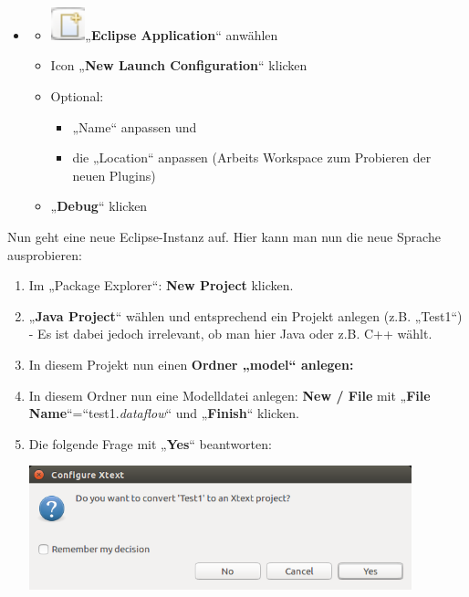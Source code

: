 \documentclass[]{article}
\providecommand{\tightlist}{%
  \setlength{\itemsep}{0pt}\setlength{\parskip}{0pt}}
\begin{document}
\begin{itemize}
\item
  \begin{itemize}
  \item
    \includegraphics[width=0.39290in,height=0.37360in]{./Pictures/10000201000000150000001454902A3E6367315A.png}„\textbf{Eclipse
    Application}`` anwählen
  \item
    Icon „\textbf{New Launch Configuration}`` klicken 
  \item
    Optional:

    \begin{itemize}
    \tightlist
    \item
      „Name`` anpassen und
    \item
      die „Location`` anpassen (Arbeits Workspace zum Probieren der
      neuen Plugins)
    \end{itemize}
  \item
    „\textbf{Debug}`` klicken
  \end{itemize}
\end{itemize}

Nun geht eine neue Eclipse-Instanz auf. Hier kann man nun die neue
Sprache ausprobieren:

\begin{enumerate}
\def\labelenumi{\arabic{enumi}.}
\item
  Im „Package Explorer``: \textbf{New Project} klicken.
\item
  „\textbf{Java Project}`` wählen und entsprechend ein Projekt anlegen
  (z.B. „Test1``) - Es ist dabei jedoch irrelevant, ob man hier Java
  oder z.B. C++ wählt.
\item
  In diesem Projekt nun einen \textbf{Ordner „model`` anlegen:\\
   }
\item
  In diesem Ordner nun eine Modelldatei anlegen: \textbf{New / File} mit
  „\textbf{File Name}``=``test1.\emph{dataflow}`` und „\textbf{Finish}``
  klicken.
\item
  Die folgende Frage mit „\textbf{Yes}`` beantworten:

  \includegraphics[width=4.36890in,height=1.40830in]{./Pictures/1000020100000263000000C5AC8B604E35219E41.png}
\end{enumerate}
\end{document}
